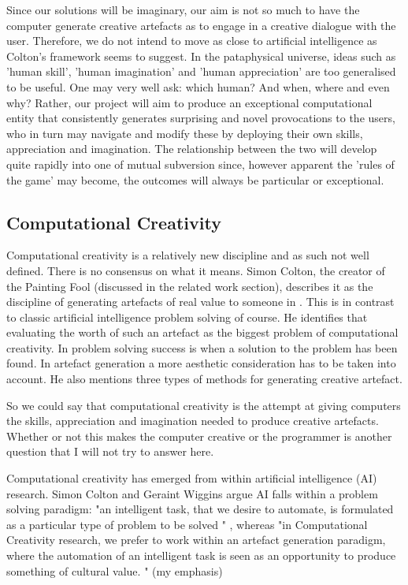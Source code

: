 Since our solutions will be imaginary, our aim is not so much to have the computer generate creative artefacts as to engage in a creative dialogue with the user. Therefore, we do not intend to move as close to artificial intelligence as Colton's framework seems to suggest. In the pataphysical universe, ideas such as 'human skill', 'human imagination' and 'human appreciation' are too generalised to be useful. One may very well ask: which human? And when, where and even why? Rather, our project will aim to produce an exceptional computational entity that consistently generates surprising and novel provocations to the users, who in turn may navigate and modify these by deploying their own skills, appreciation and imagination. The relationship between the two will develop quite rapidly into one of mutual subversion since, however apparent the 'rules of the game' may become, the outcomes will always be particular or exceptional.

\subsection{Computational Creativity}

Computational creativity is a relatively new discipline and as such not well defined. There is no consensus on what it means. Simon Colton, the creator of the Painting Fool (discussed in the related work section), describes it as the discipline of generating artefacts of real value to someone in \citep{Colton2008}. This is in contrast to classic artificial intelligence problem solving of course. He identifies that evaluating the worth of such an artefact as the biggest problem of computational creativity. In problem solving success is when a solution to the problem has been found. In artefact generation a more aesthetic consideration has to be taken into account.  He also mentions three types of methods for generating creative artefact.

So we could say that computational creativity is the attempt at giving computers the skills, appreciation and imagination needed to produce creative artefacts. Whether or not this makes the computer creative or the programmer is another question that I will not try to answer here.

Computational creativity has emerged from within artificial intelligence (AI) research. Simon Colton and Geraint Wiggins argue AI falls within a problem solving paradigm: "an intelligent task, that we desire to automate, is formulated as a particular type of problem to be solved " \citep[p.2]{Colton2012},  whereas "in Computational Creativity research, we prefer to work within an artefact generation paradigm, where the automation of an intelligent task is seen as an opportunity to produce something of cultural value. " \citep[p.2]{Colton2012}(my emphasis)

